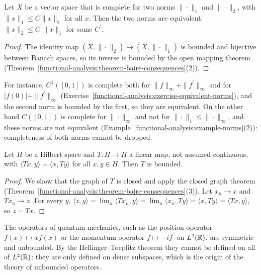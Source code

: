 \begin{corollary}\label{functional-analysis:corollary-equivalent-norms}
Let $X$ be a vector space that is complete for two norms $\|\cdot\|_1$ and $\|\cdot\|_2$, with $\|x\|_1 \leq C\|x\|_2$ for all $x$. Then the two norms are equivalent: $\|x\|_2 \leq C^{\prime}\|x\|_1$ for some
$C^{\prime}$.
\end{corollary}

\begin{proof}
The identity map $(X, \|\cdot\|_2) \to (X, \|\cdot\|_1)$ is bounded and bijective between Banach spaces, so its inverse is bounded by the open mapping theorem
(Theorem~\ref{functional-analysis:theorem-baire-consequences}(2)).
\end{proof}

For instance, $C^1([0, 1])$ is complete both for $\|f\|_\infty + \|f^{\prime}\|_\infty$ and for $|f(0)| + \|f^{\prime}\|_\infty$ (Exercise~\ref{functional-analysis:exercise-equivalent-norms}), and the second norm is
bounded by the first, so they are equivalent. On the other hand $C([0, 1])$ is complete for $\|\cdot\|_\infty$ and not for $\|\cdot\|_1 \leq \|\cdot\|_\infty$, and these norms are not equivalent
(Example~\ref{functional-analysis:example-norms}(2)): completeness of both norms cannot be dropped.

\begin{corollary}\label{functional-analysis:corollary-hellinger-toeplitz}
Let $H$ be a Hilbert space and $T \colon H \to H$ a linear map, not assumed continuous, with $\langle Tx, y \rangle = \langle x, Ty \rangle$ for all $x, y \in H$. Then $T$ is bounded.
\end{corollary}

\begin{proof}
We show that the graph of $T$ is closed and apply the closed graph theorem (Theorem~\ref{functional-analysis:theorem-baire-consequences}(3)). Let $x_n \to x$ and $Tx_n \to z$. For every $y$,
$\langle z, y \rangle = \lim_n\langle Tx_n, y \rangle = \lim_n\langle x_n, Ty \rangle = \langle x, Ty \rangle = \langle Tx, y \rangle$, so $z = Tx$.
\end{proof}

The operators of quantum mechanics, such as the position operator $f(x) \mapsto xf(x)$ or the momentum operator $f \mapsto -i f^{\prime}$ on $L^2(\mathbb{R})$, are symmetric and unbounded. By the
Hellinger--Toeplitz theorem they cannot be defined on all of $L^2(\mathbb{R})$: they are only defined on dense subspaces, which is the origin of the theory of unbounded operators.


